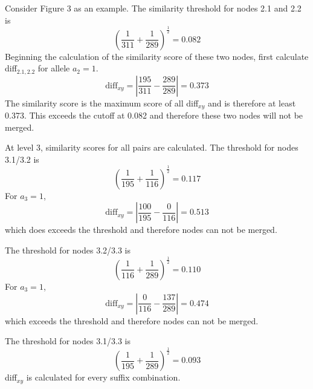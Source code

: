 \documentclass[a4paper,10pt,twoside,abstraction,titlepage]{article}
\begin{document}
\noindent Consider Figure 3 as an example.   The similarity threshold for nodes 2.1 and 2.2 is 
\vspace{-5pt}
\begin{equation*}
\left(\frac{1}{311}+\frac{1}{289}\right)^{\frac{1}{2}} = 0.082
\end{equation*}
Beginning the calculation of the similarity score of these two nodes, first calculate diff$_{2.1,2.2}$ for allele $a_2=1$.
\begin{equation*}
\mbox{diff}_{xy} = \left|\frac{195}{311}-\frac{289}{289}\right| = 0.373
\end{equation*}
The similarity score is the maximum score of all diff$_{xy}$ and is therefore at least 0.373.  This exceeds the cutoff at 0.082 and therefore these two nodes will not be merged.

\vspace{8pt}
\noindent At level 3, similarity scores for all pairs are calculated.  The threshold for nodes 3.1/3.2 is 
\vspace{-5pt}
\begin{equation*}
\left(\frac{1}{195}+\frac{1}{116}\right)^{\frac{1}{2}} = 0.117
\end{equation*}
For $a_3=1$,
\begin{equation*}
\mbox{diff}_{xy} = \left|\frac{100}{195}-\frac{0}{116}\right| = 0.513
\end{equation*}
which does exceeds the threshold and therefore nodes can not be merged.

\vspace{8pt}
\noindent The threshold for nodes 3.2/3.3 is
\vspace{-5pt}
\begin{equation*}
\left(\frac{1}{116}+\frac{1}{289}\right)^{\frac{1}{2}} = 0.110
\end{equation*}
For $a_3=1$,
\begin{equation*}
\mbox{diff}_{xy} = \left|\frac{0}{116}-\frac{137}{289}\right| = 0.474
\end{equation*}
which exceeds the threshold and therefore nodes can not be merged.

\vspace{8pt}
\noindent The threshold for nodes 3.1/3.3 is
\vspace{-5pt}
\begin{equation*}
\left(\frac{1}{195}+\frac{1}{289}\right)^{\frac{1}{2}} = 0.093
\end{equation*}
diff$_{xy}$ is calculated for every suffix combination.
\vspace{8pt}
\end{document}
